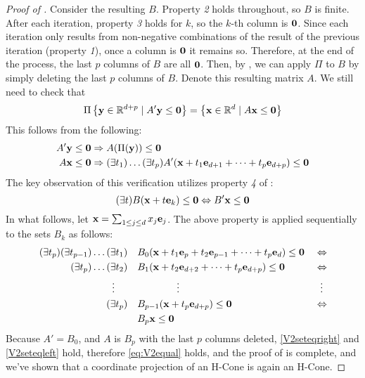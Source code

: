 \begin{proof}[Proof of ]
	Consider the resulting $B$.  Property \textit{2} holds throughout, so $B$ is finite.  After each iteration, property \textit{3} holds for $k$, so the $k$-th column is $\mathbf{0}$.  Since each iteration only results from non-negative combinations of the result of the previous iteration (property \textit{1}), once a column is $\mathbf{0}$ it remains so.  Therefore, at the end of the process, the last $p$ columns of $B$ are all $\mathbf{0}$.  Then, by , we can apply $\Pi$ to $B$ by simply deleting the last $p$ columns of $B$.  Denote this resulting matrix $A$.  We still need to check that
	\begin{equation}\label{eq:V2equal}
		\Pi\left\{\mathbf{y}\in\mathbb{R}^{d+p}\;|\; A'\mathbf{y}\leq\mathbf{0}\right\} = \left\{\mathbf{x}\in\mathbb{R}^{d}\;|\; A\mathbf{x}\leq\mathbf{0}\right\}
	\end{equation}
	This follows from the following:
	\begin{align}
		A'\mathbf{y} & \leq \mathbf{0} \Rightarrow A(\Pi(\mathbf{y})) \leq \mathbf{0} \label{V2seteqright}                                                           \\
		A\mathbf{x}  & \leq \mathbf{0} \Rightarrow (\exists t_1)\dots(\exists t_p) A'(\mathbf{x}+t_1\mathbf{e}_{d+1}+\cdots+t_p\mathbf{e}_{d+p}) \leq \mathbf{0} \label{V2seteqleft}
	\end{align}
	The key observation of this verification utilizes property \textit{4} of :
	\[ (\exists t)B(\mathbf{x} + t\mathbf{e}_k) \leq \mathbf{0} \Leftrightarrow B'\mathbf{x} \leq \mathbf{0} \]
	In what follows, let $\mathbf{x} = \sum_{1 \leq j \leq d}x_j\mathbf{e}_j$.  The above property is applied sequentially to the sets $B_k$ as follows:
	\begin{alignat*}{2}
		(\exists t_p)(\exists t_{p-1})\dots(\exists t_1)                & \quad
		B_0(\mathbf{x} + t_1\mathbf{e}_{p} + t_2\mathbf{e}_{p-1} + \dots + t_p\mathbf{e}_{d}) \leq \mathbf{0}\; & \Leftrightarrow                                                 \\
		(\exists t_p)\dots(\exists t_2)                                 & \quad
		B_1(\mathbf{x} + t_2\mathbf{e}_{d+2} + \dots + t_p\mathbf{e}_{d+p})
		\leq \mathbf{0}                                                         & \Leftrightarrow                                                 \\
		\vdots \hspace{1.3em}                                           & \hspace{5em}\vdots                       & \vdots\hspace{0.4em} \\
		(\exists t_p)                                                   & \quad B_{p-1}(\mathbf{x} + t_p\mathbf{e}_{d+p})  \leq \mathbf{0} & \Leftrightarrow      \\
		                                                                & \quad B_{p}\mathbf{x}  \leq \mathbf{0}                   &
	\end{alignat*}
	Because $A' = B_0$, and $A$ is $B_p$ with the last $p$ columns deleted, \eqref{V2seteqright} and \eqref{V2seteqleft} hold, therefore \eqref{eq:V2equal} holds, and the proof of  is complete, and we've shown that a coordinate projection of an H-Cone is again an H-Cone.
\end{proof}

